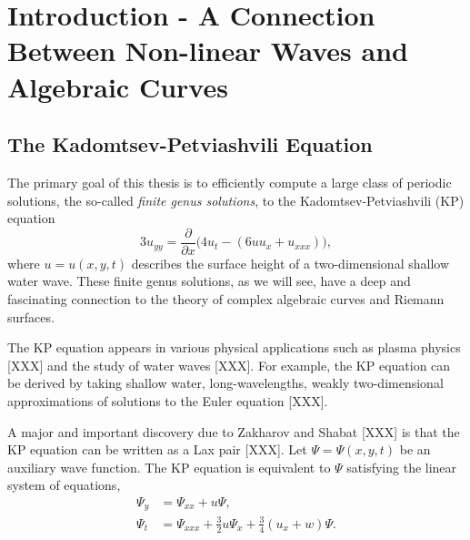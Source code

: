 \chapter{Introduction - A Connection Between Non-linear Waves and Algebraic Curves}

\section{The Kadomtsev-Petviashvili Equation}

The primary goal of this thesis is to efficiently compute a large class of
periodic solutions, the so-called {\it finite genus solutions}, to the
Kadomtsev-Petviashvili (KP) equation
\begin{equation} \label{eqn:kp}
  3u_{yy} = \frac{\partial}{\partial x} \big(
  4u_t - ( 6uu_x + u_{xxx} )
  \big),
\end{equation}
where $u = u(x,y,t)$ describes the surface height of a two-dimensional shallow
water wave. These finite genus solutions, as we will see, have a deep and
fascinating connection to the theory of complex algebraic curves and Riemann
surfaces.

The KP equation appears in various physical applications such as plasma physics
[XXX] and the study of water waves [XXX]. For example, the KP equation can be
derived by taking shallow water, long-wavelengths, weakly two-dimensional
approximations of solutions to the Euler equation [XXX].

A major and important discovery due to Zakharov and Shabat [XXX] is that the KP
equation can be written as a Lax pair [XXX]. Let $\Psi = \Psi(x,y,t)$ be an
auxiliary wave function. The KP equation is equivalent to $\Psi$ satisfying the
linear system of equations,
\begin{align}
  \Psi_y &= \Psi_{xx} + u\Psi, \label{eqn:lax-pair-a} \\ \Psi_t &= \Psi_{xxx} +
  \tfrac{3}{2}u \Psi_x + \tfrac{3}{4}(u_x + w)\Psi. \label{eqn:lax-pair-b}
\end{align}

